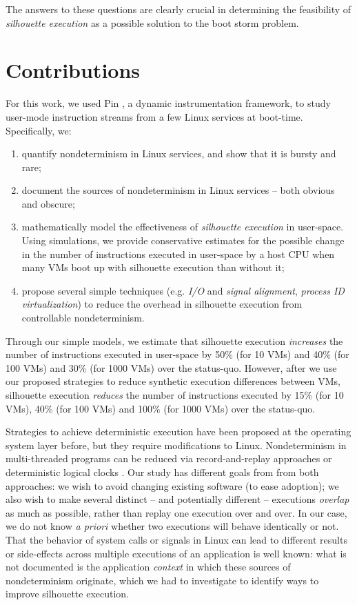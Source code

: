 The answers to these questions are clearly crucial in determining
the feasibility of \emph{silhouette execution} as a possible solution
to the boot storm problem. 

\section{Contributions}
For this work, we used Pin \cite{luk2005pin},
a dynamic instrumentation framework,
to study user-mode instruction streams from 
a few Linux services at boot-time. 
Specifically, we:
\begin {enumerate}
\item quantify nondeterminism in Linux services, and show that it is
  bursty and rare;
\item document the sources of nondeterminism in Linux services -- both obvious and obscure;
\item mathematically model the effectiveness
  of {\em silhouette execution} in user-space. Using simulations, we provide conservative estimates for the possible change in the number of instructions
  executed in user-space by a host CPU when many VMs boot up with silhouette execution than without it;
\item propose several simple techniques (e.g. {\em I/O} and {\em signal alignment}, {\em process ID virtualization})
  to reduce the overhead in silhouette execution from controllable nondeterminism.
\end {enumerate}
Through our simple models, we estimate that silhouette execution {\em increases} the number
of instructions executed in user-space by 50\% (for 10 VMs) and 40\%
(for 100 VMs) and 30\% (for 1000 VMs) over the status-quo. However, after we
use our proposed strategies to reduce synthetic execution differences
between VMs, silhouette execution {\em reduces} the number of instructions executed
by 15\% (for 10 VMs), 40\% (for 100 VMs) and 100\% (for 1000 VMs)
over the status-quo.

Strategies to achieve deterministic execution have been proposed at the operating system layer \cite{bergan2010dos} before,
but they require modifications to Linux. Nondeterminism in multi-threaded programs 
can be reduced via record-and-replay approaches \cite{patil2010pinplay} or deterministic logical clocks \cite{marek2011scaling}. 
Our study has different goals from from both approaches: we wish to avoid changing existing 
software (to ease adoption); we also wish to make several distinct -- and potentially different -- executions \emph{overlap} as much as possible, 
rather than replay one execution over and over.
In our case, we do not know \emph{a priori} whether two executions 
will behave identically or not. That the behavior of system calls or signals in Linux can lead to different results or side-effects across
multiple executions of an application is well known: what is not documented is the application \emph{context} in
which these sources of nondeterminism originate, which we had to investigate to identify
ways to improve silhouette execution. \newline

